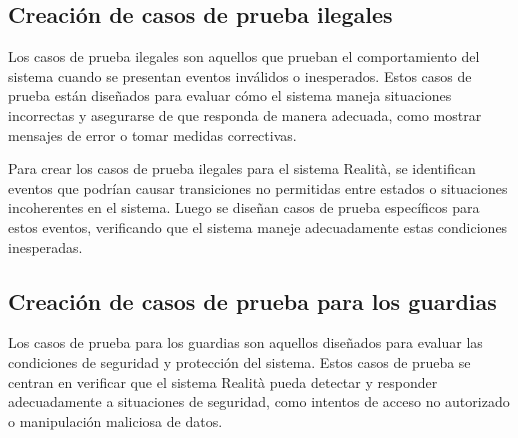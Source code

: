 \documentclass[12pt,a4paper, twoside]{article} %
\begin{document}
\subsection{Creación de casos de prueba ilegales}
\label{sec:requisitos-especificos}

Los casos de prueba ilegales son aquellos que prueban el comportamiento del sistema cuando se presentan eventos inválidos o inesperados. Estos casos de prueba están diseñados para evaluar cómo el sistema maneja situaciones incorrectas y asegurarse de que responda de manera adecuada, como mostrar mensajes de error o tomar medidas correctivas.

Para crear los casos de prueba ilegales para el sistema Realità, se identifican eventos que podrían causar transiciones no permitidas entre estados o situaciones incoherentes en el sistema. Luego se diseñan casos de prueba específicos para estos eventos, verificando que el sistema maneje adecuadamente estas condiciones inesperadas.

\begin{table}[htbp]
    \centering
    \caption{Casos de prueba ilegales para Realità}
    \label{tab:casos_prueba_ilegales}
\end{table}


\subsection{Creación de casos de prueba para los guardias}
\label{sec:requisitos-especificos}

Los casos de prueba para los guardias son aquellos diseñados para evaluar las condiciones de seguridad y protección del sistema. Estos casos de prueba se centran en verificar que el sistema Realità pueda detectar y responder adecuadamente a situaciones de seguridad, como intentos de acceso no autorizado o manipulación maliciosa de datos.
\end{document}
